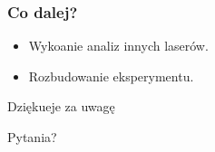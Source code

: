 \documentclass[xcolor={dvipsnames,table}]{beamer}
\begin{document}
\begin{frame}
\frametitle{Co dalej?}
\begin{itemize}
\item Wykoanie analiz innych laserów.
\item Rozbudowanie eksperymentu.
\end{itemize}
\end{frame}

\begin{frame}
\begin{Huge}
\begin{center}
Dziękueje za uwagę
\end{center}
\end{Huge}
\end{frame}

\begin{frame}
\begin{Huge}
\begin{center}
Pytania?
\end{center}
\end{Huge}
\end{frame}
\end{document}
